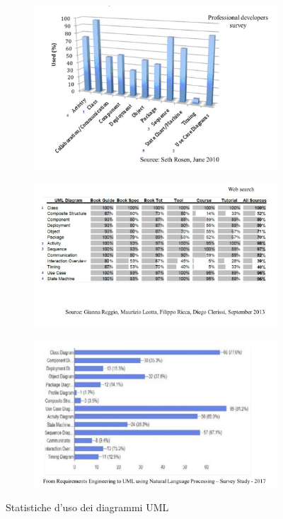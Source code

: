 \documentclass{article}
\begin{document}
	\begin{figure}[h]
		\centering
		\begin{subfigure}[b]{0.45\textwidth}
			\centering
			\includegraphics[width=\textwidth]{26.stat_uso_uml.png}
			\caption{}
			\label{fig:im-26}
		\end{subfigure}
		\hfill
		\begin{subfigure}[b]{0.5\textwidth}
			\centering
			\includegraphics[width=\textwidth]{27.stat_uso_uml.png}
			\caption{}
			\label{fig:im-27}
		\end{subfigure}
		\hfill
		\begin{subfigure}[b]{0.6\textwidth}
			\centering
			\includegraphics[width=\textwidth]{28.stat_uso_uml.png}
			\caption{}
			\label{fig:im-28}
		\end{subfigure}
		\caption{Statistiche d'uso dei diagrammi UML}
	\end{figure}
\end{document}
